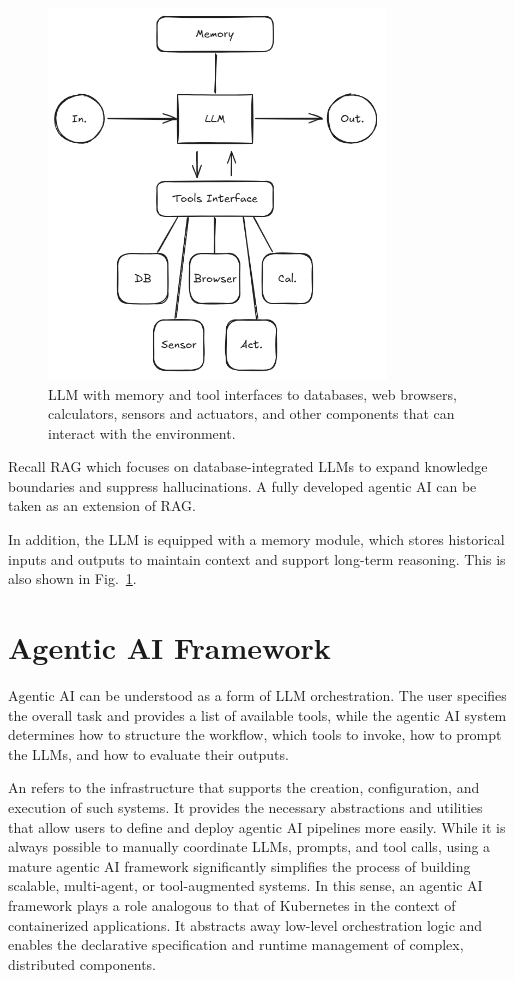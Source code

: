 \begin{figure}[!htb]
	\centering
	\includegraphics[width=0.8\textwidth]{./chapters/part-4/figures/agenticaiworkflow3.png}
	\caption{LLM with memory and tool interfaces to databases, web browsers, calculators, sensors and actuators, and other components that can interact with the environment.}
	\label{fig:agenticwf3}
\end{figure}

Recall RAG which focuses on database-integrated LLMs to expand knowledge boundaries and suppress hallucinations. A fully developed agentic AI can be taken as an extension of RAG.

In addition, the LLM is equipped with a memory module, which stores historical inputs and outputs to maintain context and support long-term reasoning. This is also shown in Fig.~\ref{fig:agenticwf3}.

\section{Agentic AI Framework}

Agentic AI can be understood as a form of LLM orchestration. The user specifies the overall task and provides a list of available tools, while the agentic AI system determines how to structure the workflow, which tools to invoke, how to prompt the LLMs, and how to evaluate their outputs.

An  refers to the infrastructure that supports the creation, configuration, and execution of such systems. It provides the necessary abstractions and utilities that allow users to define and deploy agentic AI pipelines more easily. While it is always possible to manually coordinate LLMs, prompts, and tool calls, using a mature agentic AI framework significantly simplifies the process of building scalable, multi-agent, or tool-augmented systems. In this sense, an agentic AI framework plays a role analogous to that of Kubernetes in the context of containerized applications. It abstracts away low-level orchestration logic and enables the declarative specification and runtime management of complex, distributed components. 


